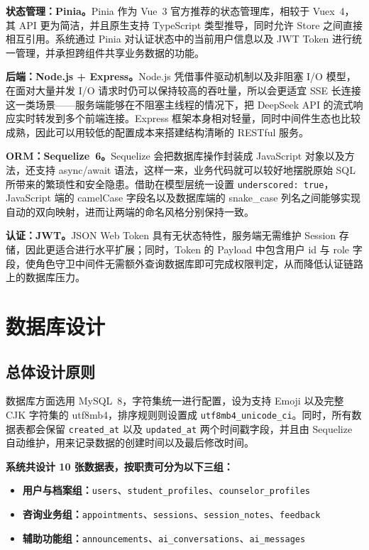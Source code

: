\textbf{状态管理：Pinia。}Pinia 作为 Vue~3 官方推荐的状态管理库\cite{piniadocs}，相较于 Vuex~4，其 API 更为简洁，并且原生支持 TypeScript 类型推导，同时允许 Store 之间直接相互引用。系统通过 Pinia 对认证状态中的当前用户信息以及 JWT Token 进行统一管理，并承担跨组件共享业务数据的功能。

\textbf{后端：Node.js + Express。}Node.js 凭借事件驱动机制以及非阻塞 I/O 模型，在面对大量并发 I/O 请求时仍可以保持较高的吞吐量\cite{cantelon2018}，所以会更适宜 SSE 长连接这一类场景——服务端能够在不阻塞主线程的情况下，把 DeepSeek API 的流式响应实时转发到多个前端连接\cite{hahn2016}。Express 框架本身相对轻量，同时中间件生态也比较成熟，因此可以用较低的配置成本来搭建结构清晰的 RESTful 服务。

\textbf{ORM：Sequelize~6。}Sequelize 会把数据库操作封装成 JavaScript 对象以及方法，还支持 async/await 语法，这样一来，业务代码就可以较好地摆脱原始 SQL 所带来的繁琐性和安全隐患\cite{seqdocs}。借助在模型层统一设置 \texttt{underscored: true}，JavaScript 端的 camelCase 字段名以及数据库端的 snake\_case 列名之间能够实现自动的双向映射，进而让两端的命名风格分别保持一致。

\textbf{认证：JWT。}JSON Web Token 具有无状态特性，服务端无需维护 Session 存储，因此更适合进行水平扩展；同时，Token 的 Payload 中包含用户 id 与 role 字段，使角色守卫中间件无需额外查询数据库即可完成权限判定，从而降低认证链路上的数据库压力\cite{jones2015}。


\section{数据库设计}

\subsection{总体设计原则}

数据库方面选用 MySQL~8，字符集统一进行配置，设为支持 Emoji 以及完整 CJK 字符集的 utf8mb4，排序规则则设置成 \texttt{utf8mb4\_unicode\_ci}\cite{mysql80docs}。同时，所有数据表都会保留 \texttt{created\_at} 以及 \texttt{updated\_at} 两个时间戳字段，并且由 Sequelize 自动维护，用来记录数据的创建时间以及最后修改时间。

\textbf{系统共设计 10 张数据表，按职责可分为以下三组：}
\begin{itemize}
    \item \textbf{用户与档案组：}\texttt{users}、\texttt{student\_profiles}、\texttt{counselor\_profiles}
    \item \textbf{咨询业务组：}\texttt{appointments}、\texttt{sessions}、\texttt{session\_notes}、\texttt{feedback}
    \item \textbf{辅助功能组：}\texttt{announcements}、\texttt{ai\_conversations}、\texttt{ai\_messages}
\end{itemize}


